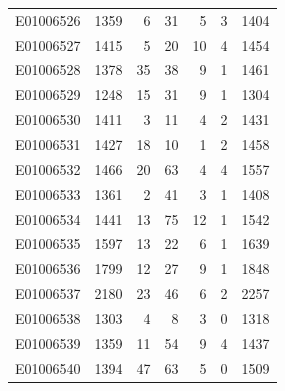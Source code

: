 \documentclass[
  letterpaper,
  DIV=11,
  numbers=noendperiod]{scrreprt}
\begin{document}
\begin{tabular}{lrrrrrr}
E01006526     &    1359 &       6 &                    31 &                               5 &                       3 &              1404 \\
E01006527     &    1415 &       5 &                    20 &                              10 &                       4 &              1454 \\
E01006528     &    1378 &      35 &                    38 &                               9 &                       1 &              1461 \\
E01006529     &    1248 &      15 &                    31 &                               9 &                       1 &              1304 \\
E01006530     &    1411 &       3 &                    11 &                               4 &                       2 &              1431 \\
E01006531     &    1427 &      18 &                    10 &                               1 &                       2 &              1458 \\
E01006532     &    1466 &      20 &                    63 &                               4 &                       4 &              1557 \\
E01006533     &    1361 &       2 &                    41 &                               3 &                       1 &              1408 \\
E01006534     &    1441 &      13 &                    75 &                              12 &                       1 &              1542 \\
E01006535     &    1597 &      13 &                    22 &                               6 &                       1 &              1639 \\
E01006536     &    1799 &      12 &                    27 &                               9 &                       1 &              1848 \\
E01006537     &    2180 &      23 &                    46 &                               6 &                       2 &              2257 \\
E01006538     &    1303 &       4 &                     8 &                               3 &                       0 &              1318 \\
E01006539     &    1359 &      11 &                    54 &                               9 &                       4 &              1437 \\
E01006540     &    1394 &      47 &                    63 &                               5 &                       0 &              1509 \\

\end{tabular}
\end{document}
